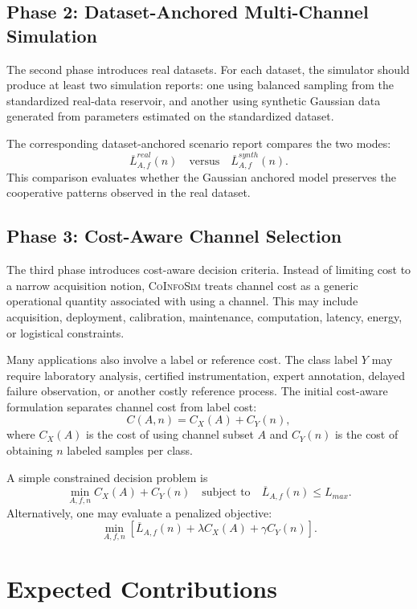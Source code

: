 \documentclass[11pt,a4paper]{article}
\newcommand{\CoInfoSim}{\textsc{CoInfoSim}}
\begin{document}
\subsection{Phase 2: Dataset-Anchored Multi-Channel Simulation}

The second phase introduces real datasets. For each dataset, the simulator should produce at least two simulation reports: one using balanced sampling from the standardized real-data reservoir, and another using synthetic Gaussian data generated from parameters estimated on the standardized dataset.

The corresponding dataset-anchored scenario report compares the two modes:
\[
    \overline{L}^{real}_{A,f}(n)
    \quad \text{versus} \quad
    \overline{L}^{synth}_{A,f}(n).
\]
This comparison evaluates whether the Gaussian anchored model preserves the cooperative patterns observed in the real dataset.

\subsection{Phase 3: Cost-Aware Channel Selection}

The third phase introduces cost-aware decision criteria. Instead of limiting cost to a narrow acquisition notion, \CoInfoSim{} treats channel cost as a generic operational quantity associated with using a channel. This may include acquisition, deployment, calibration, maintenance, computation, latency, energy, or logistical constraints.

Many applications also involve a label or reference cost. The class label $Y$ may require laboratory analysis, certified instrumentation, expert annotation, delayed failure observation, or another costly reference process. The initial cost-aware formulation separates channel cost from label cost:
\[
    C(A,n)=C_X(A)+C_Y(n),
\]
where $C_X(A)$ is the cost of using channel subset $A$ and $C_Y(n)$ is the cost of obtaining $n$ labeled samples per class.

A simple constrained decision problem is
\[
    \min_{A,f,n} C_X(A)+C_Y(n)
    \quad\text{subject to}\quad
    \overline{L}_{A,f}(n)\leq L_{max}.
\]
Alternatively, one may evaluate a penalized objective:
\[
    \min_{A,f,n}
    \left[\overline{L}_{A,f}(n)+\lambda C_X(A)+\gamma C_Y(n)\right].
\]

\section{Expected Contributions}
\end{document}
